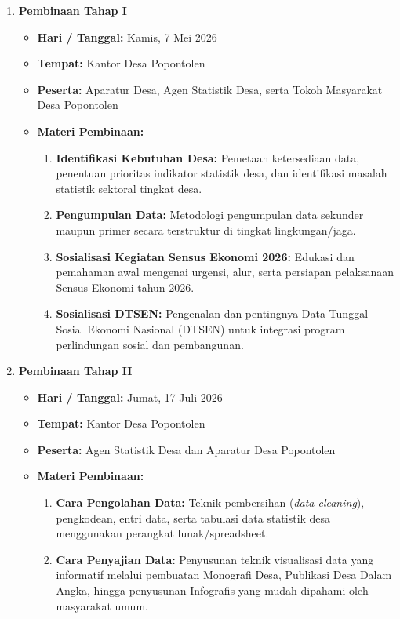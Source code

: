 \begin{enumerate}[label=\textbf{\textcolor{bpsnavy}{\arabic*.}}]
  \item \textbf{Pembinaan Tahap I}
  \begin{itemize}
    \item \textbf{Hari / Tanggal:} Kamis, 7 Mei 2026
    \item \textbf{Tempat:} Kantor Desa Popontolen
    \item \textbf{Peserta:} Aparatur Desa, Agen Statistik Desa, serta Tokoh Masyarakat Desa Popontolen
    \item \textbf{Materi Pembinaan:}
    \begin{enumerate}[label=\textcolor{bpsnavy}{\arabic*.}]
      \item \textbf{Identifikasi Kebutuhan Desa:} Pemetaan ketersediaan data, penentuan prioritas indikator statistik desa, dan identifikasi masalah statistik sektoral tingkat desa.
      \item \textbf{Pengumpulan Data:} Metodologi pengumpulan data sekunder maupun primer secara terstruktur di tingkat lingkungan/jaga.
      \item \textbf{Sosialisasi Kegiatan Sensus Ekonomi 2026:} Edukasi dan pemahaman awal mengenai urgensi, alur, serta persiapan pelaksanaan Sensus Ekonomi tahun 2026.
      \item \textbf{Sosialisasi DTSEN:} Pengenalan dan pentingnya Data Tunggal Sosial Ekonomi Nasional (DTSEN) untuk integrasi program perlindungan sosial dan pembangunan.
    \end{enumerate}
  \end{itemize}

  \item \textbf{Pembinaan Tahap II}
  \begin{itemize}
    \item \textbf{Hari / Tanggal:} Jumat, 17 Juli 2026
    \item \textbf{Tempat:} Kantor Desa Popontolen
    \item \textbf{Peserta:} Agen Statistik Desa dan Aparatur Desa Popontolen
    \item \textbf{Materi Pembinaan:}
    \begin{enumerate}[label=\textcolor{bpsnavy}{\arabic*.}]
      \item \textbf{Cara Pengolahan Data:} Teknik pembersihan (\textit{data cleaning}), pengkodean, entri data, serta tabulasi data statistik desa menggunakan perangkat lunak/spreadsheet.
      \item \textbf{Cara Penyajian Data:} Penyusunan teknik visualisasi data yang informatif melalui pembuatan Monografi Desa, Publikasi Desa Dalam Angka, hingga penyusunan Infografis yang mudah dipahami oleh masyarakat umum.
    \end{enumerate}
  \end{itemize}
\end{enumerate}

